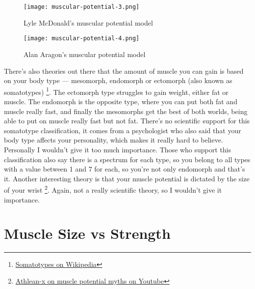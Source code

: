 \documentclass[openany, 12pt]{book}
\begin{document}
        \begin{figure}[h]
		\centering
		\texttt{[image: muscular-potential-3.png]}
		\caption{Lyle McDonald's muscular potential model}
		\label{fig16}
	\end{figure}

        \begin{figure}[h!]
		\centering
		\texttt{[image: muscular-potential-4.png]}
		\caption{Alan Aragon's muscular potential model}
		\label{fig17}
	\end{figure}
        
        There's also theories out there that the amount of muscle you can gain is based on your body type ---
        mesomorph, endomorph or ectomorph (also known as somatotypes)
        \footnote{\href{https://en.wikipedia.org/wiki/Somatotype_and_constitutional_psychology}{Somatotypes on Wikipedia}}. The ectomorph type struggles to gain weight, either fat or muscle.
        The endomorph is the opposite type, where you can put both fat and muscle really fast, and finally the mesomorphs get the best of both worlds, being able to put on muscle really fast
        but not fat. There's no scientific support for this somatotype classification, it comes from a psychologist who also said that your body type affects your personality, which makes it
        really hard to believe. Personally I wouldn't give it too much importance. Those who support this classification also say there is a spectrum for each type, so you belong to all types
        with a value between 1 and 7 for each, so you're not only endomorph and that's it. Another interesting theory is that your muscle potential is dictated by the size of your wrist
        \footnote{\href{https://www.youtube.com/watch?v=xLrNHB5O6f8}{Athlean-x on muscle potential myths on Youtube}}. Again, not a really scientific theory, so I wouldn't give it importance.

        \section{Muscle Size vs Strength}
\end{document}
